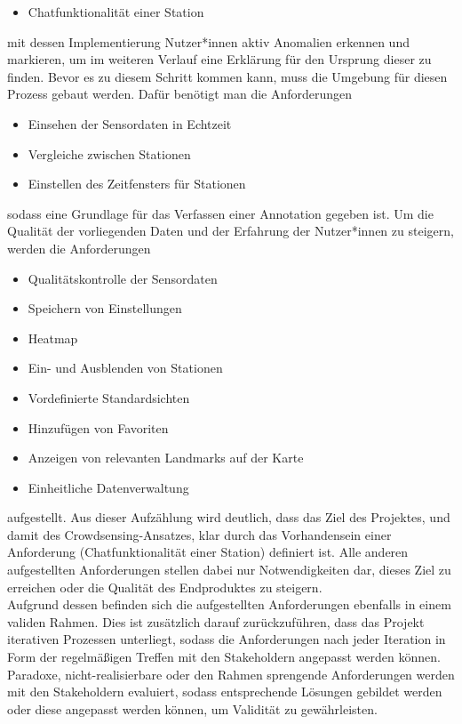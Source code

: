 \begin{itemize}
    \item Chatfunktionalität einer Station
\end{itemize}

mit dessen Implementierung Nutzer*innen aktiv Anomalien erkennen und markieren, um im weiteren Verlauf eine Erklärung für den Ursprung dieser zu finden. Bevor es zu diesem Schritt kommen kann, muss die Umgebung für diesen Prozess gebaut werden. Dafür benötigt man die Anforderungen 

\begin{itemize}
    \item Einsehen der Sensordaten in Echtzeit
    \item Vergleiche zwischen Stationen
    \item Einstellen des Zeitfensters für Stationen
\end{itemize}

sodass eine Grundlage für das Verfassen einer Annotation gegeben ist. Um die Qualität der vorliegenden Daten und der Erfahrung der Nutzer*innen zu steigern, werden die Anforderungen 

\begin{itemize}
    \item Qualitätskontrolle der Sensordaten
    \item Speichern von Einstellungen
    \item Heatmap
    \item Ein- und Ausblenden von Stationen
    \item Vordefinierte Standardsichten
    \item Hinzufügen von Favoriten
    \item Anzeigen von relevanten Landmarks auf der Karte
    \item Einheitliche Datenverwaltung
\end{itemize}

aufgestellt. Aus dieser Aufzählung wird deutlich, dass das Ziel des Projektes, und damit des Crowdsensing-Ansatzes, klar durch das Vorhandensein einer Anforderung (Chatfunktionalität einer Station) definiert ist. Alle anderen aufgestellten Anforderungen stellen dabei nur Notwendigkeiten dar, dieses Ziel zu erreichen oder die Qualität des Endproduktes zu steigern. \\ Aufgrund dessen befinden sich die aufgestellten Anforderungen ebenfalls in einem validen Rahmen. Dies ist zusätzlich darauf zurückzuführen, dass das Projekt iterativen Prozessen unterliegt, sodass die Anforderungen nach jeder Iteration in Form der regelmäßigen Treffen mit den Stakeholdern angepasst werden können. Paradoxe, nicht-realisierbare oder den Rahmen sprengende Anforderungen werden mit den Stakeholdern evaluiert, sodass entsprechende Lösungen gebildet werden oder diese angepasst werden können, um Validität zu gewährleisten.

